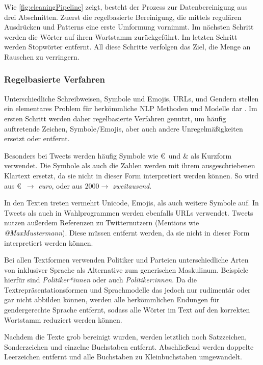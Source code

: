 Wie \autoref{fig:cleaningPipeline} zeigt, besteht der Prozess zur Datenbereinigung aus drei Abschnitten. Zuerst die regelbasierte Bereinigung, die mittels regulären Ausdrücken und Patterns eine erste Umformung vornimmt. Im nächsten Schritt werden die Wörter auf ihren Wortstamm zurückgeführt. Im letzten Schritt werden Stopwörter entfernt. All diese Schritte verfolgen das Ziel, die Menge an Rauschen zu verringern. 

\subsubsection{Regelbasierte Verfahren}

Unterschiedliche Schreibweisen, Symbole und Emojis, \acp{URL}, und Gendern stellen ein elementares Problem für herkömmliche \ac{NLP} Methoden und Modelle dar \autocite[4\psq]{kowsari_text_2019}. Im ersten Schritt werden daher regelbasierte Verfahren genutzt, um häufig auftretende Zeichen, Symbole/Emojis, aber auch andere Unregelmäßigkeiten ersetzt oder entfernt.

Besonders bei Tweets werden häufig Symbole wie \euro~und \& als Kurzform verwendet. Die Symbole als auch die Zahlen werden mit ihrem ausgeschriebenen Klartext ersetzt, da sie nicht in dieser Form interpretiert werden können. So wird aus \euro~\(\rightarrow\) \textit{euro}, oder aus \(\num{2000} \rightarrow\) \textit{zweitausend}.

In den Texten treten vermehrt Unicode, Emojis, als auch weitere Symbole auf. In Tweets als auch in Wahlprogrammen werden ebenfalls \acp{URL} verwendet. Tweets nutzen außerdem Referenzen zu Twitternutzern (Mentions wie \textit{@MaxMustermann}). Diese müssen entfernt werden, da sie nicht in dieser Form interpretiert werden können.

Bei allen Textformen verwenden Politiker und Parteien unterschiedliche Arten von inklusiver Sprache als Alternative zum generischen Maskulinum. Beispiele hierfür sind \textit{Politiker*innen} oder auch \textit{Politiker:innen}. Da die Textrepräsentationsformen und Sprachmodelle das jedoch nur rudimentär oder gar nicht abbilden können, werden alle herkömmlichen Endungen für gendergerechte Sprache entfernt, sodass alle Wörter im Text auf den korrekten Wortstamm reduziert werden können.

Nachdem die Texte grob bereinigt wurden, werden letztlich noch Satzzeichen, Sonderzeichen und einzelne Buchstaben entfernt. Abschließend werden doppelte Leerzeichen entfernt und alle Buchstaben zu Kleinbuchstaben umgewandelt.

